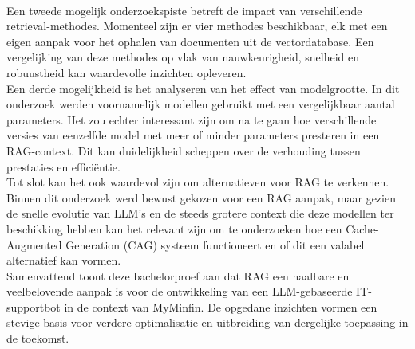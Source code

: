 \\[1em]
Een tweede mogelijk onderzoekspiste betreft de impact van verschillende retrieval-methodes. Momenteel zijn er vier methodes beschikbaar, elk met een eigen aanpak voor het ophalen van documenten uit de vectordatabase. Een vergelijking van deze methodes op vlak van nauwkeurigheid, snelheid en robuustheid kan waardevolle inzichten opleveren.
\\[1em]
Een derde mogelijkheid is het analyseren van het effect van modelgrootte. In dit onderzoek werden voornamelijk modellen gebruikt met een vergelijkbaar aantal parameters. Het zou echter interessant zijn om na te gaan hoe verschillende versies van eenzelfde model met meer of minder parameters presteren in een RAG-context. Dit kan duidelijkheid scheppen over de verhouding tussen prestaties en efficiëntie.
\\[1em]
Tot slot kan het ook waardevol zijn om alternatieven voor RAG te verkennen. Binnen dit onderzoek werd bewust gekozen voor een RAG aanpak, maar gezien de snelle evolutie van LLM's en de steeds grotere context die deze modellen ter beschikking hebben kan het relevant zijn om te onderzoeken hoe een Cache-Augmented Generation (CAG) systeem functioneert en of dit een valabel alternatief kan vormen.
\\[1em]
Samenvattend toont deze bachelorproef aan dat RAG een haalbare en veelbelovende aanpak is voor de ontwikkeling van een LLM-gebaseerde IT-supportbot in de context van MyMinfin. De opgedane inzichten vormen een stevige basis voor verdere optimalisatie en uitbreiding van dergelijke toepassing in de toekomst.